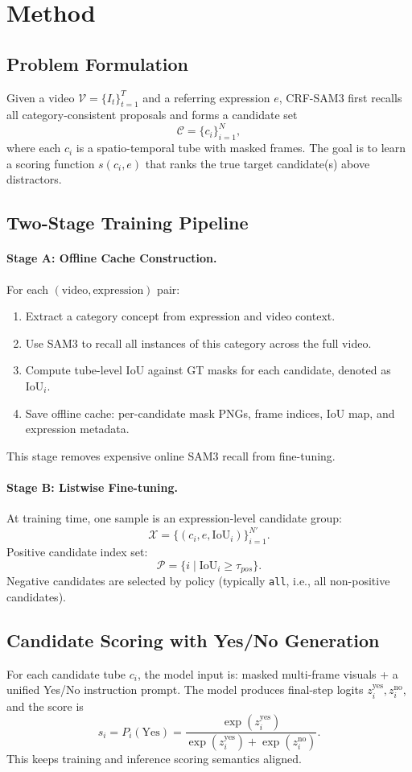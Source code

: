 \section{Method}

\subsection{Problem Formulation}
Given a video $\mathcal{V}=\{I_t\}_{t=1}^{T}$ and a referring expression $e$, CRF-SAM3 first recalls all category-consistent proposals and forms a candidate set
\[
\mathcal{C}=\{c_i\}_{i=1}^{N},
\]
where each $c_i$ is a spatio-temporal tube with masked frames. The goal is to learn a scoring function $s(c_i,e)$ that ranks the true target candidate(s) above distractors.

\subsection{Two-Stage Training Pipeline}
\paragraph{Stage A: Offline Cache Construction.}
For each $(\text{video},\text{expression})$ pair:
\begin{enumerate}
\item Extract a category concept from expression and video context.
\item Use SAM3 to recall all instances of this category across the full video.
\item Compute tube-level IoU against GT masks for each candidate, denoted as $\text{IoU}_i$.
\item Save offline cache: per-candidate mask PNGs, frame indices, IoU map, and expression metadata.
\end{enumerate}
This stage removes expensive online SAM3 recall from fine-tuning.

\paragraph{Stage B: Listwise Fine-tuning.}
At training time, one sample is an expression-level candidate group:
\[
\mathcal{X}=\{(c_i,e,\text{IoU}_i)\}_{i=1}^{N'}.
\]
Positive candidate index set:
\[
\mathcal{P}=\{i\mid \text{IoU}_i\ge \tau_{pos}\}.
\]
Negative candidates are selected by policy (typically \texttt{all}, i.e., all non-positive candidates).

\subsection{Candidate Scoring with Yes/No Generation}
For each candidate tube $c_i$, the model input is: masked multi-frame visuals + a unified Yes/No instruction prompt. The model produces final-step logits $z_i^{\text{yes}}, z_i^{\text{no}}$, and the score is
\[
s_i=P_i(\text{Yes})=\frac{\exp(z_i^{\text{yes}})}{\exp(z_i^{\text{yes}})+\exp(z_i^{\text{no}})}.
\]
This keeps training and inference scoring semantics aligned.

